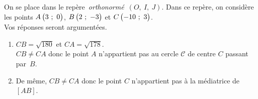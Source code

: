 \documentclass[a4paper,12pt,twocolumn,landscape]{article}
\newcommand{\rep}[3]{~$\left(#1,~#2,~#3\right)$}
\begin{document}
\newpage

\begin{minipage}{0.45\textwidth}
\thispagestyle{vide}

\vspace*{1em}

\exercice
On se place dans le repère~\emph{orthonormé}\rep{O}{I}{J}. Dans ce repère, on considère les points $A\begin{pmatrix}3~;~0\end{pmatrix}$, $B\begin{pmatrix}2~;~-3\end{pmatrix}$ et $C\begin{pmatrix}-10~;~3\end{pmatrix}$.\\Vos réponses seront argumentées.

	\begin{enumerate}
		\item $CB = \sqrt{180}$ et $CA = \sqrt{178}$.\\
				$CB \neq CA$ donc le point $A$ n'appartient pas au cercle $\mathscr{C}$ de centre $C$ passant par~$B$.
		\item De même, $CB \neq CA$ donc le point $C$ n'appartient pas à la médiatrice de $\left[AB\right]$.
	\end{enumerate}

\end{minipage}

\newpage
\end{document}
